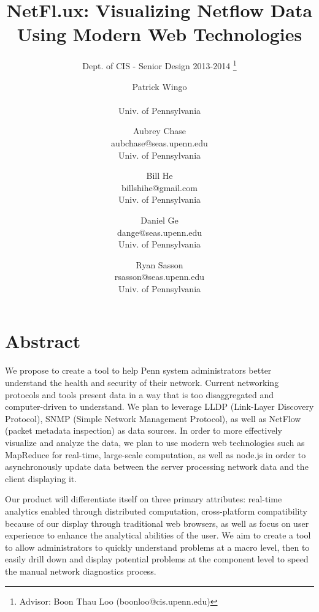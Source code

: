 \documentclass{sig-alternate}
\begin{document}
\title{NetFl.ux: Visualizing Netflow Data Using Modern Web Technologies}
\subtitle{Dept. of CIS - Senior Design 2013-2014
    \thanks{Advisor: Boon Thau Loo (boonloo@cis.upenn.edu)}}
\author{Patrick Wingo\\ \\ Univ. of Pennsylvania
    \and Aubrey Chase\\ aubchase@seas.upenn.edu\\ Univ. of Pennsylvania
    \and Bill He\\ billshihe@gmail.com\\ Univ. of Pennsylvania
    \and Daniel Ge\\ dange@seas.upenn.edu\\ Univ. of Pennsylvania
    \and Ryan Sasson\\ rsasson@seas.upenn.edu\\ Univ. of Pennsylvania}

\maketitle

\section*{Abstract}

We propose to create a tool to help Penn system administrators better understand
the health and security of their network.  Current networking protocols and
tools present data in a way that is too disaggregated and computer-driven to
understand. We plan to leverage LLDP (Link-Layer Discovery Protocol), SNMP
(Simple Network Management Protocol), as well as NetFlow (packet metadata
inspection) as data sources. In order to more effectively visualize and analyze
the data, we plan to use modern web technologies such as MapReduce for
real-time, large-scale computation, as well as node.js in order to
asynchronously update data between the server processing network data and the
client displaying it.

Our product will differentiate itself on three primary attributes: real-time
analytics enabled through distributed computation, cross-platform compatibility
because of our display through traditional web browsers, as well as focus on
user experience to enhance the analytical abilities of the user. We aim to
create a tool to allow administrators to quickly understand problems at a macro
level, then to easily drill down and display potential problems at the component
level to speed the manual network diagnostics process.
\end{document}
